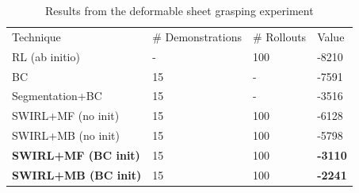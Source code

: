 \begin{table}[]
\centering
\scriptsize
\caption{Results from the deformable sheet grasping experiment}
\label{my-label}
\begin{tabular}{llll}
\rowcolor[HTML]{000000} 
{\color[HTML]{FFFFFF} Technique} & {\color[HTML]{FFFFFF} \# Demonstrations} & {\color[HTML]{FFFFFF} \# Rollouts} & {\color[HTML]{FFFFFF} Value} \\
RL (ab initio)                   & -                                        & 100                                & -8210                        \\
BC                               & 15                                       & -                                  & -7591                        \\
Segmentation+BC                  & 15                                       & -                                  & -3516                        \\
SWIRL+MF (no init)                  & 15                                       & 100                                & -6128                        \\
SWIRL+MB (no init)                  & 15                                       & 100                                & -5798                        \\
\textbf{SWIRL+MF (BC init)}                  & 15                                       & 100                                & \textbf{-3110}     \\
\textbf{SWIRL+MB (BC init)}                  & 15                                       & 100                                & \textbf{-2241}                       
\end{tabular}
\end{table}



